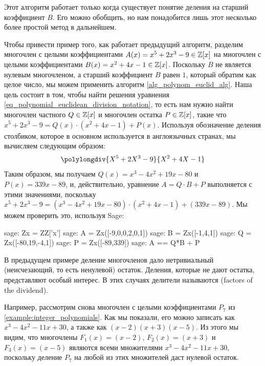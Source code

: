 Этот алгоритм работает только когда существует понятие деления на старший коэффициент $B$. Его можно обобщить, но нам понадобится лишь этот несколько более простой метод в дальнейшем.
\begin{example} Чтобы привести пример того, как работает предыдущий алгоритм, разделим многочлен с целыми коэффициентами $A(x)=x^5+2x^3-9\in \mathbb{Z}[x]$ на многочлен с целыми коэффициентами $B(x)=x^2+4x-1\in\mathbb{Z}[x]$. Поскольку $B$ не является нулевым многочленом, а старший коэффициент $B$ равен $1$, который обратим как целое число, мы можем применить алгоритм \ref{alg_polynom_euclid_alg}. Наша цель состоит в том, чтобы найти решения уравнения \ref{eq_polynomial_euclidean_division_notation}, то есть нам нужно найти многочлен частного $Q\in\mathbb{Z}[x]$ и многочлен остатка $P \in \mathbb{Z}[x]$, такие что $x^5+2x^3-9 = Q(x)\cdot (x^2+4x-1) + P(x)$. Используя обозначение деления столбиком, которое в основном используется в англоязычных странах, мы вычисляем следующим образом:
\begin{equation}
\polylongdiv{X^5+2X^3-9}{X^2+4X-1}
\end{equation}
Таким образом, мы получаем $Q(x)=x^3-4x^2+19x-80$ и $P(x)=339x-89$, и, действительно, уравнение $ A=  Q \cdot B + P$ выполняется с этими значениями, поскольку $x^5+2x^3-9 = (x^3-4x^2+19x-80)\cdot (x^2+4x-1) + (339x-89)$. Мы можем проверить это, используя Sage:
\begin{sagecommandline}
sage: Zx = ZZ['x']
sage: A = Zx([-9,0,0,2,0,1])
sage: B = Zx([-1,4,1])
sage: Q = Zx([-80,19,-4,1])
sage: P = Zx([-89,339])
sage: A == Q*B + P
\end{sagecommandline}
\end{example}
\begin{example} В предыдущем примере деление многочленов дало нетривиальный (неисчезающий, то есть ненулевой) остаток. Деления, которые не дают остатка, представляют особый интерес. В этих случаях делители называются  (factors of the dividend).

Например, рассмотрим снова многочлен с целыми коэффициентами $P_7$ из \examplename{} \ref{example:integer_polynomials}. Как мы показали, его можно записать как $x^3 - 4 x^2 - 11 x + 30$, а также как $(x-2)(x + 3)(x-5)$. Из этого мы видим, что многочлены $F_1(x)=(x-2)$, $F_2(x)=(x+3)$ и $F_3(x)=(x-5)$ являются всеми множителями $x^3 - 4 x^2 - 11 x + 30$, поскольку деление $P_7$ на любой из этих множителей даст нулевой остаток.
\end{example}
